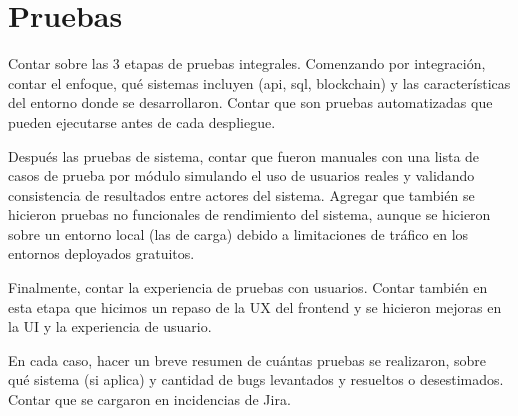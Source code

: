 \chapter[Pruebas]{Pruebas}
\label{cp:testing}

\parindent0pt

Contar sobre las 3 etapas de pruebas integrales. Comenzando por integración, contar el enfoque, qué sistemas incluyen (api, sql, blockchain) y las características del entorno donde se desarrollaron. Contar que son pruebas automatizadas que pueden ejecutarse antes de cada despliegue. 

Después las pruebas de sistema, contar que fueron manuales con una lista de casos de prueba por módulo simulando el uso de usuarios reales y validando consistencia de resultados entre actores del sistema. Agregar que también se hicieron pruebas no funcionales de rendimiento del sistema, aunque se hicieron sobre un entorno local (las de carga) debido a limitaciones de tráfico en los entornos deployados gratuitos. 

Finalmente, contar la experiencia de pruebas con usuarios. Contar también en esta etapa que hicimos un repaso de la UX del frontend y se hicieron mejoras en la UI y la experiencia de usuario.

En cada caso, hacer un breve resumen de cuántas pruebas se realizaron, sobre qué sistema (si aplica) y cantidad de bugs levantados y resueltos o desestimados. Contar que se cargaron en incidencias de Jira.
